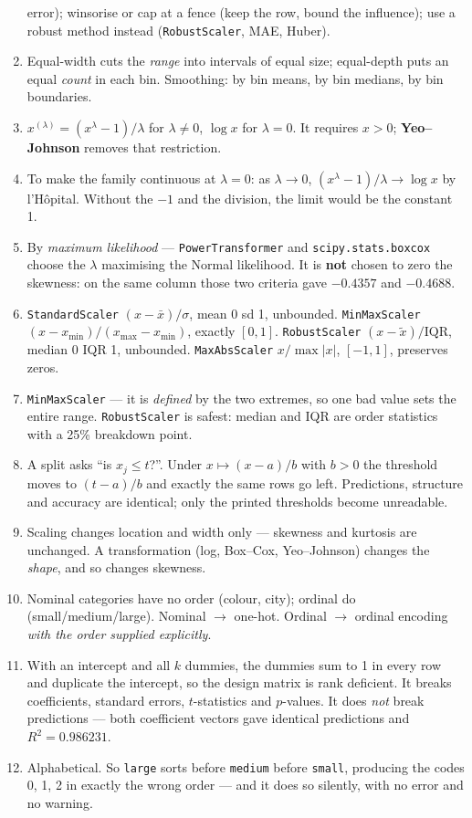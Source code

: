 \documentclass[11pt,a4paper]{article}
\newcommand{\A}[1]{\item[\textbf{#1}]}
\begin{document}
\begin{enumerate}[leftmargin=1.9cm]
error); winsorise or cap at a fence (keep the row, bound the influence); use a
robust method instead (\texttt{RobustScaler}, MAE, Huber).
\A{U4.15} Equal-width cuts the \emph{range} into intervals of equal size;
equal-depth puts an equal \emph{count} in each bin. Smoothing: by bin means, by
bin medians, by bin boundaries.
\A{U4.16} $x^{(\lambda)} = (x^\lambda - 1)/\lambda$ for $\lambda \ne 0$,
$\log x$ for $\lambda = 0$. It requires $x > 0$; \textbf{Yeo--Johnson} removes
that restriction.
\A{U4.17} To make the family continuous at $\lambda = 0$: as $\lambda \to 0$,
$(x^\lambda - 1)/\lambda \to \log x$ by l'H\^opital. Without the $-1$ and the
division, the limit would be the constant 1.
\A{U4.18} By \emph{maximum likelihood} --- \texttt{PowerTransformer} and
\texttt{scipy.stats.boxcox} choose the $\lambda$ maximising the Normal
likelihood. It is \textbf{not} chosen to zero the skewness: on the same column
those two criteria gave $-0.4357$ and $-0.4688$.
\A{U4.19} \texttt{StandardScaler} $(x-\bar x)/\sigma$, mean 0 sd 1, unbounded.
\texttt{MinMaxScaler} $(x-x_{\min})/(x_{\max}-x_{\min})$, exactly $[0,1]$.
\texttt{RobustScaler} $(x-\tilde x)/\text{IQR}$, median 0 IQR 1, unbounded.
\texttt{MaxAbsScaler} $x/\max|x|$, $[-1,1]$, preserves zeros.
\A{U4.20} \texttt{MinMaxScaler} --- it is \emph{defined} by the two extremes,
so one bad value sets the entire range. \texttt{RobustScaler} is safest: median
and IQR are order statistics with a 25\% breakdown point.
\A{U4.21} A split asks ``is $x_j \le t$?''. Under $x \mapsto (x-a)/b$ with
$b > 0$ the threshold moves to $(t-a)/b$ and exactly the same rows go left.
Predictions, structure and accuracy are identical; only the printed thresholds
become unreadable.
\A{U4.22} Scaling changes location and width only --- skewness and kurtosis are
unchanged. A transformation (log, Box--Cox, Yeo--Johnson) changes the
\emph{shape}, and so changes skewness.
\A{U4.23} Nominal categories have no order (colour, city); ordinal do
(small/medium/large). Nominal $\to$ one-hot. Ordinal $\to$ ordinal encoding
\emph{with the order supplied explicitly}.
\A{U4.24} With an intercept and all $k$ dummies, the dummies sum to 1 in every
row and duplicate the intercept, so the design matrix is rank deficient. It
breaks coefficients, standard errors, $t$-statistics and $p$-values. It does
\emph{not} break predictions --- both coefficient vectors gave identical
predictions and $R^2 = 0.986231$.
\A{U4.25} Alphabetical. So \texttt{large} sorts before \texttt{medium} before
\texttt{small}, producing the codes 0, 1, 2 in exactly the wrong order --- and
it does so silently, with no error and no warning.

\end{enumerate}
\end{document}
